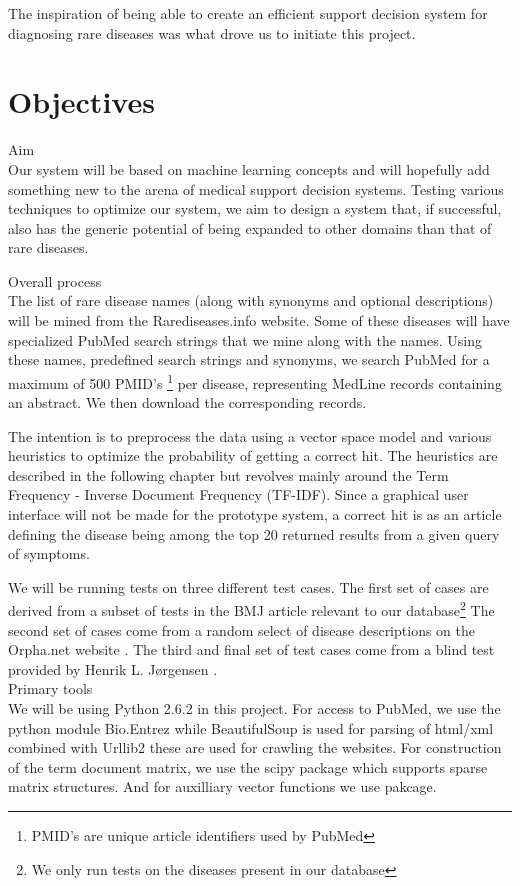 The inspiration of being able to create an efficient support decision
system for diagnosing rare diseases was what drove us to initiate this
project.

\section{Objectives}

Aim \\
Our system will be based on machine learning concepts and will
hopefully add something new to the arena of medical support decision
systems. Testing various techniques to optimize our system, we aim to
design a system that, if successful, also has the generic potential of
being expanded to other domains than that of rare diseases.

Overall process \\
The list of rare disease names (along with synonyms and optional
descriptions) will be mined from the Rarediseases.info website. Some
of these diseases will have specialized PubMed search strings that we
mine along with the names. Using these names, predefined search
strings and synonyms, we search PubMed for a maximum of 500
PMID's \footnote{PMID's are unique article identifiers used by PubMed}
per disease, representing MedLine records containing an abstract. We
then download the corresponding records.

The intention is to preprocess the data using a vector space model and
various heuristics to optimize the probability of getting a correct
hit. The heuristics are described in the following chapter but
revolves mainly around the Term Frequency - Inverse Document Frequency
(TF-IDF). Since a graphical user interface will not be made for the
prototype system, a correct hit is as an article defining the disease
being among the top 20 returned results from a given query of
symptoms.

We will be running tests on three different test cases. The first set
of cases are derived from a subset of tests in the BMJ article
\cite{HangwiTang11102006} relevant to our database\footnote{We only
  run tests on the diseases present in our database} The second set of
cases come from a random select of disease descriptions on the
Orpha.net website \cite{Orphanet}. The third and final set of test
cases come from a blind test provided by Henrik L. Jørgensen
\cite{TheDude}.
\\
Primary tools \\

We will be using Python 2.6.2 \cite{PythonLanguage} in this
project. For access to PubMed, we use the python module Bio.Entrez
\cite{EntrezProgUtil} while BeautifulSoup \cite{BS} is used for
parsing of html/xml combined with Urllib2 \cite{UL2} these are used
for crawling the websites. For construction of the term document
matrix, we use the scipy \cite{SciPy} package which supports sparse
matrix structures. And for auxilliary vector functions we use
\cite{NumPy} pakcage.


